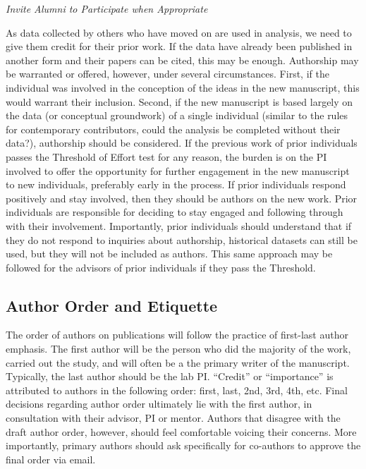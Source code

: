 \documentclass[]{article}
\begin{document}
\emph{Invite Alumni to Participate when Appropriate}

As data collected by others who have moved on are used in analysis, we
need to give them credit for their prior work. If the data have already
been published in another form and their papers can be cited, this may
be enough. Authorship may be warranted or offered, however, under
several circumstances. First, if the individual was involved in the
conception of the ideas in the new manuscript, this would warrant their
inclusion. Second, if the new manuscript is based largely on the data
(or conceptual groundwork) of a single individual (similar to the rules
for contemporary contributors, could the analysis be completed without
their data?), authorship should be considered. If the previous work of
prior individuals passes the Threshold of Effort test for any reason,
the burden is on the PI involved to offer the opportunity for further
engagement in the new manuscript to new individuals, preferably early in
the process. If prior individuals respond positively and stay involved,
then they should be authors on the new work. Prior individuals are
responsible for deciding to stay engaged and following through with
their involvement. Importantly, prior individuals should understand that
if they do not respond to inquiries about authorship, historical
datasets can still be used, but they will not be included as authors.
This same approach may be followed for the advisors of prior individuals
if they pass the Threshold.

\hypertarget{author-order-and-etiquette}{%
\subsection{\texorpdfstring{\textbf{Author Order and
Etiquette}}{Author Order and Etiquette}}\label{author-order-and-etiquette}}

The order of authors on publications will follow the practice of
first-last author emphasis. The first author will be the person who did
the majority of the work, carried out the study, and will often be a the
primary writer of the manuscript. Typically, the last author should be
the lab PI. ``Credit'' or ``importance'' is attributed to authors in the
following order: first, last, 2nd, 3rd, 4th, etc. Final decisions
regarding author order ultimately lie with the first author, in
consultation with their advisor, PI or mentor. Authors that disagree
with the draft author order, however, should feel comfortable voicing
their concerns. More importantly, primary authors should ask
specifically for co-authors to approve the final order via email.
\end{document}
